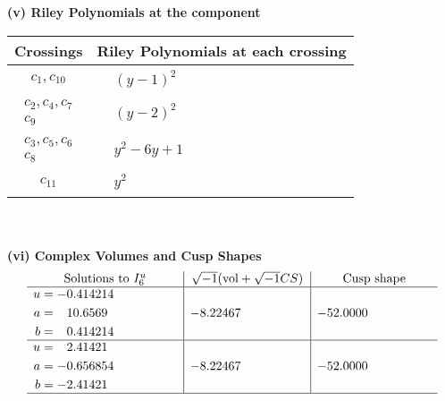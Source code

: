 \documentclass[1p]{elsarticle_modified}
\theoremstyle{definition}
\newcommand{\I}{\sqrt{-1}}
\begin{document}
\newpage\renewcommand{\arraystretch}{1}
\flushleft \textbf{(v) Riley Polynomials at the component}\newline \\
\begin{tabular}{m{50pt}|m{274pt}}
Crossings & \hspace{64pt}Riley Polynomials at each crossing \\
\hline $$\begin{aligned}c_{1},c_{10}\end{aligned}$$&$\begin{aligned}
&(y-1)^2
\end{aligned}$\\
\hline $$\begin{aligned}c_{2},c_{4},c_{7}\\c_{9}\end{aligned}$$&$\begin{aligned}
&(y-2)^2
\end{aligned}$\\
\hline $$\begin{aligned}c_{3},c_{5},c_{6}\\c_{8}\end{aligned}$$&$\begin{aligned}
&y^2-6 y+1
\end{aligned}$\\
\hline $$\begin{aligned}c_{11}\end{aligned}$$&$\begin{aligned}
&y^2
\end{aligned}$\\
\hline
\end{tabular}\\~\\
\newpage\flushleft \textbf{(vi) Complex Volumes and Cusp Shapes}
$$\begin{array}{c|c|c}  
\text{Solutions to }I^u_{6}& \I (\text{vol} + \sqrt{-1}CS) & \text{Cusp shape}\\
 \hline 
\begin{aligned}
u &= -0.414214\phantom{ +0.000000I} \\
a &= \phantom{-}10.6569\phantom{ +0.000000I} \\
b &= \phantom{-}0.414214\phantom{ +0.000000I}\end{aligned}
 & -8.22467\phantom{ +0.000000I} & -52.0000\phantom{ +0.000000I} \\ \hline\begin{aligned}
u &= \phantom{-}2.41421\phantom{ +0.000000I} \\
a &= -0.656854\phantom{ +0.000000I} \\
b &= -2.41421\phantom{ +0.000000I}\end{aligned}
 & -8.22467\phantom{ +0.000000I} & -52.0000\phantom{ +0.000000I}\\
 \hline 
 \end{array}$$\newpage\newpage\renewcommand{\arraystretch}{1}
\end{document}
